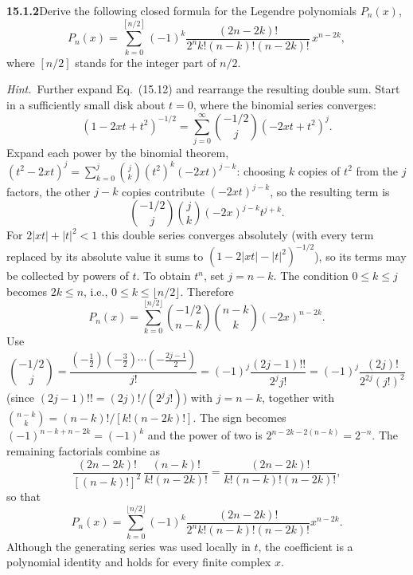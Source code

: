 \par\bigskip
\noindent\textbf{15.1.2}\quad Derive the following closed formula for
the Legendre polynomials $P_{n}(x)$,
\[
P_{n}(x)=\sum_{k=0}^{[n/2]}(-1)^{k}
\frac{(2n-2k)!}{2^{n}k!(n-k)!(n-2k)!}\,x^{n-2k},
\]
where $[n/2]$ stands for the integer part of $n/2$.
\par\emph{Hint.}~Further expand Eq.~(15.12) and rearrange the
resulting double sum.
\solution
Start in a sufficiently small disk about $t=0$, where the binomial
series converges:
\[
(1-2xt+t^2)^{-1/2}
=\sum_{j=0}^\infty\binom{-1/2}{j}(-2xt+t^2)^j.
\]
Expand each power by the binomial theorem,
$(t^2-2xt)^j=\sum_{k=0}^j\binom jk(t^2)^k(-2xt)^{j-k}$: choosing $k$
copies of $t^2$ from the $j$ factors, the other $j-k$ copies contribute
$(-2xt)^{j-k}$, so the resulting term is
\[
\binom{-1/2}{j}\binom jk(-2x)^{j-k}t^{j+k}.
\]
For $2|xt|+|t|^2<1$ this double series converges absolutely (with every
term replaced by its absolute value it sums to $(1-2|xt|-|t|^2)^{-1/2}$),
so its terms may be collected by powers of $t$.
To obtain $t^n$, set $j=n-k$. The condition $0\le k\le j$
becomes $2k\le n$, i.e., $0\le k\le\lfloor n/2\rfloor$. Therefore
\[
P_n(x)=\sum_{k=0}^{\lfloor n/2\rfloor}
\binom{-1/2}{n-k}\binom{n-k}{k}(-2x)^{n-2k}.
\]
Use
\[
\binom{-1/2}{j}=\frac{(-\frac12)(-\frac32)\cdots(-\frac{2j-1}2)}{j!}
=(-1)^j\frac{(2j-1)!!}{2^jj!}=(-1)^j\frac{(2j)!}{2^{2j}(j!)^2}
\]
(since $(2j-1)!!=(2j)!/(2^jj!)$) with $j=n-k$, together with
$\binom{n-k}{k}=(n-k)!/[k!(n-2k)!]$.
The sign becomes $(-1)^{n-k+n-2k}=(-1)^k$ and the power of two is
$2^{n-2k-2(n-k)}=2^{-n}$. The remaining factorials combine as
\[
\frac{(2n-2k)!}{[(n-k)!]^2}\,\frac{(n-k)!}{k!(n-2k)!}
=\frac{(2n-2k)!}{k!(n-k)!(n-2k)!},
\]
so that
\[
\boxed{P_n(x)=\sum_{k=0}^{\lfloor n/2\rfloor}
(-1)^k\frac{(2n-2k)!}{2^nk!(n-k)!(n-2k)!}x^{n-2k}}.
\]
Although the generating series was used locally in $t$, the coefficient
is a polynomial identity and holds for every finite complex $x$.

